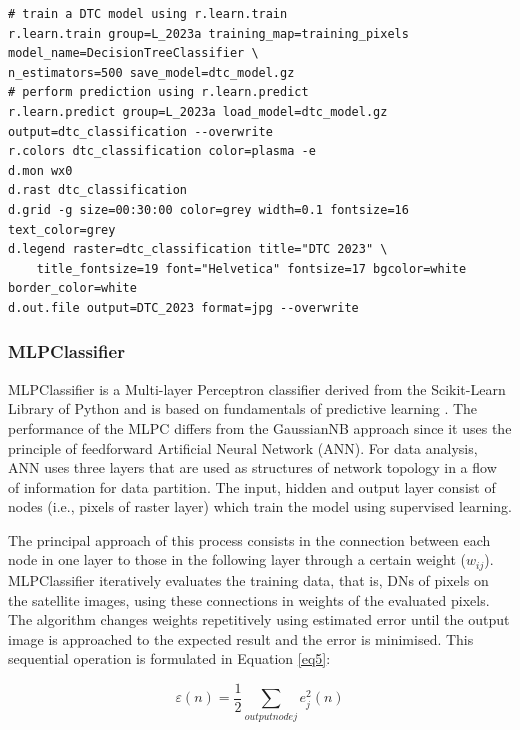 \documentclass{elektr}
\begin{document}
\begin{footnotesize}
\begin{verbatim}
# train a DTC model using r.learn.train
r.learn.train group=L_2023a training_map=training_pixels model_name=DecisionTreeClassifier \
n_estimators=500 save_model=dtc_model.gz
# perform prediction using r.learn.predict
r.learn.predict group=L_2023a load_model=dtc_model.gz output=dtc_classification --overwrite
r.colors dtc_classification color=plasma -e
d.mon wx0
d.rast dtc_classification
d.grid -g size=00:30:00 color=grey width=0.1 fontsize=16 text_color=grey
d.legend raster=dtc_classification title="DTC 2023" \
	title_fontsize=19 font="Helvetica" fontsize=17 bgcolor=white border_color=white
d.out.file output=DTC_2023 format=jpg --overwrite
\end{verbatim}
\end{footnotesize}

\subsubsection{MLPClassifier}

MLPClassifier is a Multi-layer Perceptron classifier derived from the Scikit-Learn Library of Python and is based on fundamentals of predictive learning \cite{Rosenblatt}. The performance of the MLPC differs from the GaussianNB approach since it uses the principle of feedforward Artificial Neural Network (ANN). For data analysis, ANN uses three layers that are used as structures of network topology in a flow of information for data partition. The input, hidden and output layer consist of nodes (i.e., pixels of raster layer) which train the model using supervised learning. 

The principal approach of this process consists in the connection between each node in one layer to those in the following layer through a certain weight ($w_{ij}$). MLPClassifier iteratively evaluates the training data, that is, DNs of pixels on the satellite images, using these connections in weights of the evaluated pixels. The algorithm changes weights repetitively using estimated error until the output image is approached to the expected result and the error is minimised. This sequential operation is formulated in Equation \ref{eq5}: 

\begin{equation}
\varepsilon(n)=\frac{1}{2} \sum_{output node j}{e_{j}^2(n)}
\label{eq5}
\end{equation}
\end{document}
